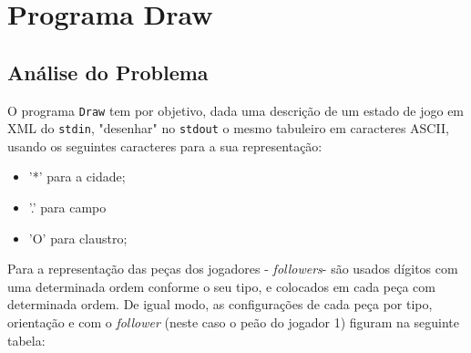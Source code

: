 \chapter{Programa Draw}

\section{Análise do Problema}


O programa \texttt{Draw} tem por objetivo, dada uma descrição de um estado de jogo em XML do
\texttt{stdin}, "desenhar" no \texttt{stdout} o mesmo tabuleiro em caracteres ASCII, usando os seguintes
caracteres para a sua representação:
\begin{itemize}
\item '*' para a cidade;
\item '.' para campo 
\item 'O' para claustro;
\end{itemize}
Para a representação das  peças dos jogadores - \emph{followers}- são usados  dígitos com uma determinada
ordem conforme o seu tipo, e colocados em cada  peça com determinada ordem. De igual modo, as configurações
de cada  peça por tipo, orientação  e com o  \emph{follower} (neste caso o  peão do jogador 1)  figuram na
seguinte tabela:
